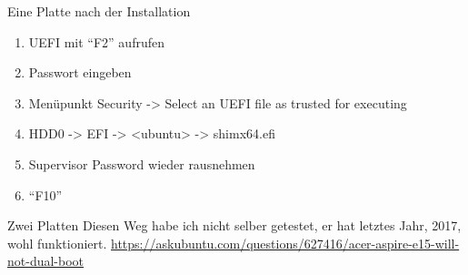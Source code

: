 \begin{frame}{Eine Platte}
    nach der Installation
    \begin{enumerate}
        \item UEFI mit \enquote{F2} aufrufen
        \item Passwort eingeben
        \item Menüpunkt Security -> Select an UEFI file as trusted for executing
        \item HDD0 -> EFI -> <ubuntu> -> shimx64.efi
        \item Supervisor Password wieder rausnehmen
        \item \enquote{F10}
    \end{enumerate}
\end{frame}

\begin{frame}{Zwei Platten}
    Diesen Weg habe ich nicht selber getestet, er hat letztes Jahr, 2017, wohl funktioniert.
    \url{https://askubuntu.com/questions/627416/acer-aspire-e15-will-not-dual-boot}
\end{frame}
